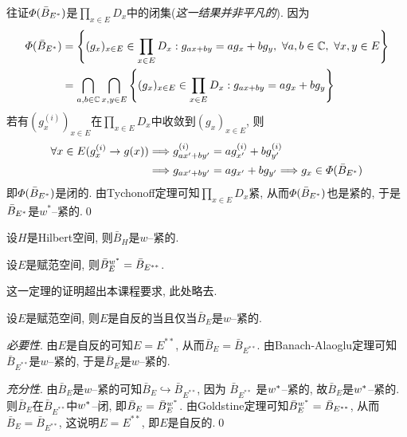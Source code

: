 \begin{Proof}
    往证$ \varPhi(\bar{B}_{E^{*}}) $是$ \prod\limits_{x\in E}D_x $中的闭集(\textsl{这一结果并非平凡的}). 因为
    \[
    \begin{aligned}
    \varPhi(\bar{B}_{\Star{E}})&=\left\{ (g_x)_{x\in E}\in\prod_{x\in E}D_x : g_{ax+by}=ag_x+bg_y,\ \forall a,b\in\C,\ \forall x,y\in E \right\}\\
    &=\bigcap_{a,b\in\C}\bigcap_{x,y\in E}\left\{ (g_x)_{x\in E}\in\prod_{x\in E}D_x : g_{ax+by}=ag_x+bg_y \right\}
    \end{aligned}
    \]
    若有$ (g_x^{(i)})_{x\in E} $在$ \prod\limits_{x\in E}D_x $中收敛到$ (g_x)_{x\in E} $, 则
    \[
    \begin{aligned}
    \forall x\in E(g_x^{(i)}\to g(x))&\Longrightarrow g_{ax'+by'}^{(i)}=ag_{x'}^{(i)}+bg_{y'}^{(i)}\\
    &\Longrightarrow g_{ax'+by'}=ag_{x'}+bg_{y'}\Longrightarrow g_x\in\varPhi(\bar{B}_{E^{*}})
    \end{aligned}
    \]
    即$ \varPhi(\bar{B}_{E^{*}}) $是闭的. 由Tychonoff定理可知$ \prod\limits_{x\in E}D_x $紧, 从而$ \varPhi(\bar{B}_{E^{*}}) $也是紧的, 于是$ \bar{B}_{E^{*}} $是$ w^* $--紧的.\qed
    \end{Proof}

    \begin{Corollary}
    设$ H $是Hilbert空间, 则$ \bar{B}_H $是$ w $--紧的.
    \end{Corollary}

    \begin{Theorem}[Goldstine]
    设$ E $是赋范空间, 则$ \bar{B}_E^{w^{*}}=\bar{B}_{E^{**}} $.
    \end{Theorem}

    这一定理的证明超出本课程要求, 此处略去.

    \begin{Corollary}[Banach]
    设$ E $是赋范空间, 则$ E $是自反的当且仅当$ \bar{B}_E $是$ w $--紧的.
    \end{Corollary}
    \begin{Proof}
    \textsl{必要性}. 由$ E $是自反的可知$ E=E^{**} $, 从而$ \bar{B}_E=\bar{B}_{E^{**}} $. 由Banach-Alaoglu定理可知$ \bar{B}_{E^{**}} $是$ w $--紧的, 于是$ \bar{B}_E $是$ w $--紧的.

    \textsl{充分性}. 由$ \bar{B}_E $是$ w $--紧的可知$ \bar{B}_E\hookrightarrow\bar{B}_{E^{**}} $, 因为 $ \bar{B}_{E^{**}} $ 是$ w^{*} $--紧的, 故$ \bar{B}_E $是$ w^{*} $--紧的. 则$ \bar{B}_E $在$ \bar{B}_{E^{**}} $中$ w^{*} $--闭, 即$ \bar{B}_E=\bar{B}_E^{w^{*}} $. 由Goldstine定理可知$ \bar{B}_E^{w^{*}}=\bar{B}_{E^{**}} $, 从而$ \bar{B}_E=\bar{B}_{E^{**}} $, 这说明$ E=E^{**} $, 即$ E $是自反的.\qed
    \end{Proof}


